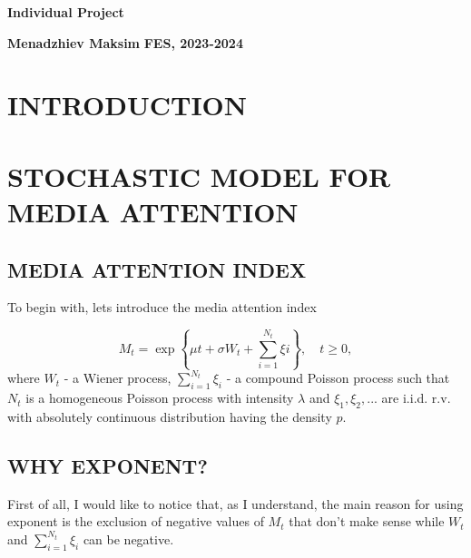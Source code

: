 



\begin{center}
        {\bfseries \LARGE Individual Project}
\end{center}

\begin{center}
    \begin{flushleft}
        
            \vspace{-20pt}
            
            \textbf{Menadzhiev Maksim} \hfill \textbf{FES, 2023-2024}
            
            \vspace{-30pt}
            
            \hrulefill
 
    \end{flushleft}
\end{center}


\section{INTRODUCTION}

\section{STOCHASTIC MODEL FOR MEDIA ATTENTION}

\subsection{MEDIA ATTENTION INDEX}
To begin with, lets introduce the media attention index

\[M_{t} = \exp \left\{ {\mu t + \sigma W_{t} + \sum \limits_{i=1}^{N_{t}} \xi{i}} \right\}, \quad t \geq 0,\] where $W_{t}$ - a Wiener process, $\sum \limits_{i=1}^{N_{t}} \xi_{i}$ - a compound Poisson process such that $N_{t}$ is a homogeneous Poisson process with intensity $\lambda$ and $\xi_{1}, \xi_{2},$... are i.i.d. r.v. with absolutely continuous distribution having the density $p$.

\subsection{WHY EXPONENT?}

First of all, I would like to notice that, as I understand, the main reason for using exponent is the exclusion of negative values of $M_{t}$ that don't make sense while $W_{t}$ and $\sum \limits_{i=1}^{N_{t}} \xi_{i}$ can be negative.


